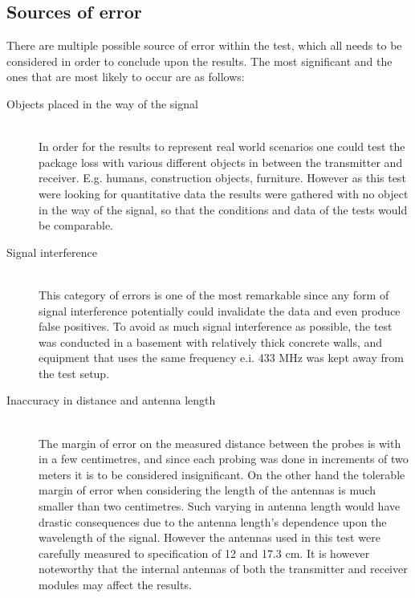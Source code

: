 \subsection{Sources of error}
There are multiple possible source of error within the test, which all needs to be considered in order to conclude upon the results.
The most significant and the ones that are most likely to occur are as follows:
\begin{description}
    \item[Objects placed in the way of the signal] \hfill \\
    In order for the results to represent real world scenarios one could test the package loss with various different objects in between the transmitter and receiver. 
    E.g. humans, construction objects, furniture.
    However as this test were looking for quantitative data the results were gathered with no object in the way of the signal, so that the conditions and data of the tests would be comparable.
    \item[Signal interference] \hfill \\
    This category of errors is one of the most remarkable since any form of signal interference potentially could invalidate the data and even produce false positives.
    To avoid as much signal interference as possible, the test was conducted in a basement with relatively thick concrete walls, and equipment that uses the same frequency e.i. 433 MHz was kept away from the test setup.
    \item[Inaccuracy in distance and antenna length] \hfill \\
    The margin of error on the measured distance between the probes is with in a few centimetres, and since each probing was done in increments of two meters it is to be considered insignificant.
    On the other hand the tolerable margin of error when considering the length of the antennas is much smaller than two centimetres.
    Such varying in antenna length would have drastic consequences due to the antenna length's dependence upon the wavelength of the signal.
    However the antennas used in this test were carefully measured to specification of 12 and 17.3 cm.
    It is however noteworthy that the internal antennas of both the transmitter and receiver modules may affect the results.
\end{description}

